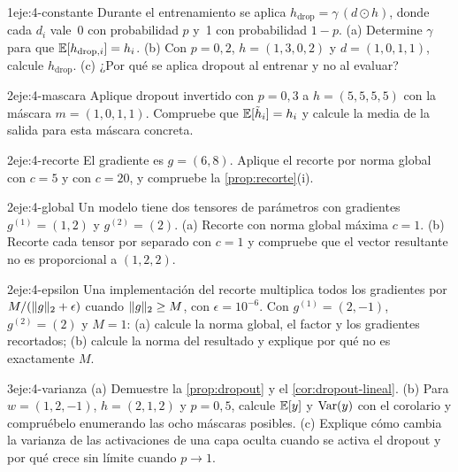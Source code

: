 \begin{ejercicio}{1}{eje:4-constante}
Durante el entrenamiento se aplica $h_{\mathrm{drop}}=\gamma\,(d\odot h)$, donde cada $d_i$ vale~0 con probabilidad $p$ y~1 con probabilidad $1-p$. (a) Determine $\gamma$ para que $\mathbb{E}[h_{\mathrm{drop},i}]=h_i$. (b) Con $p=0{,}2$, $h=(1,3,0,2)$ y $d=(1,0,1,1)$, calcule $h_{\mathrm{drop}}$. (c) ¿Por qué se aplica dropout al entrenar y no al evaluar?
\end{ejercicio}

\begin{ejercicio}{2}{eje:4-mascara}
Aplique dropout invertido con $p=0{,}3$ a $h=(5,5,5,5)$ con la máscara $m=(1,0,1,1)$. Compruebe que $\mathbb{E}[\tilde h_i]=h_i$ y calcule la media de la salida para esta máscara concreta.
\end{ejercicio}

\begin{ejercicio}{2}{eje:4-recorte}
El gradiente es $g=(6,8)$. Aplique el recorte por norma global con $c=5$ y con $c=20$, y compruebe la \cref{prop:recorte}(i).
\end{ejercicio}

\begin{ejercicio}{2}{eje:4-global}
Un modelo tiene dos tensores de parámetros con gradientes $g^{(1)}=(1,2)$ y $g^{(2)}=(2)$. (a) Recorte con norma global máxima $c=1$. (b) Recorte cada tensor por separado con $c=1$ y compruebe que el vector resultante no es proporcional a $(1,2,2)$.
\end{ejercicio}

\begin{ejercicio}{2}{eje:4-epsilon}
Una implementación del recorte multiplica todos los gradientes por $M/(\lVert g\rVert_2+\epsilon)$ cuando $\lVert g\rVert_2\ge M$, con $\epsilon=10^{-6}$. Con $g^{(1)}=(2,-1)$, $g^{(2)}=(2)$ y $M=1$: (a) calcule la norma global, el factor y los gradientes recortados; (b) calcule la norma del resultado y explique por qué no es exactamente $M$.
\end{ejercicio}

\begin{ejercicio}{3}{eje:4-varianza}
(a) Demuestre la \cref{prop:dropout} y el \cref{cor:dropout-lineal}. (b) Para $w=(1,2,-1)$, $h=(2,1,2)$ y $p=0{,}5$, calcule $\mathbb{E}[y]$ y $\operatorname{Var}(y)$ con el corolario y compruébelo enumerando las ocho máscaras posibles. (c) Explique cómo cambia la varianza de las activaciones de una capa oculta cuando se activa el dropout y por qué crece sin límite cuando $p\to 1$.
\end{ejercicio}
